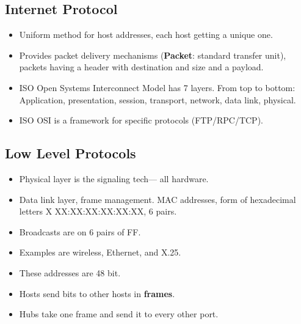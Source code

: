 \documentclass[fontsize=4.5pt]{scrartcl}
\begin{document}
\begin{multicols}{3}
    \subsection{Internet Protocol}
      \begin{itemize}
        \item Uniform method for host addresses, each host getting a unique one.
        \item Provides packet delivery mechanisms (\textbf{Packet}: standard transfer unit), packets having a header with destination and size and a payload.
        \item ISO Open Systems Interconnect Model has 7 layers. From top to bottom: Application, presentation, session, transport, network, data link, physical.
        \item ISO OSI is a framework for specific protocols (FTP/RPC/TCP).
      \end{itemize}
     \subsection{Low Level Protocols}
       \begin{itemize}
         \item Physical layer is the signaling tech--- all hardware.
         \item Data link layer, frame management. MAC addresses, form of hexadecimal letters X XX:XX:XX:XX:XX:XX, 6 pairs.
         \item Broadcasts are on 6 pairs of FF.
         \item Examples are wireless, Ethernet, and X.25.
         \item These addresses are 48 bit.
         \item Hosts send bits to other hosts in \textbf{frames}.
         \item Hubs take one frame and send it to every other port.
       \end{itemize}

\end{multicols}
\end{document}
